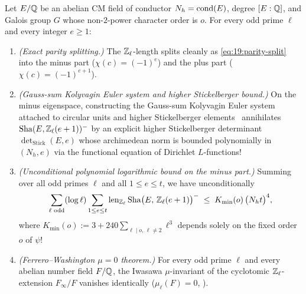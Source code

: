 \begin{theorem}
\label{thm:19:minus-part}
Let $E/\mathbb{Q}$ be an abelian CM field of conductor $N_h = \operatorname{cond}(E)$, degree $[E:\mathbb{Q}]$, and Galois group $G$ whose non-$2$-power character order is $o$. For every odd prime $\ell$ and every integer $e \ge 1$:
\begin{enumerate}[label=\textup{(\roman*)}]
\item \emph{(Exact parity splitting.)} The $\mathbb{Z}_\ell$-length splits cleanly as \eqref{eq:19:parity-split} into the minus part ($\chi(c) = (-1)^e$) and the plus part ($\chi(c) = (-1)^{e+1}$).
\item \emph{(Gauss-sum Kolyvagin Euler system and higher Stickelberger bound.)} On the minus eigenspace, constructing the Gauss-sum Kolyvagin Euler system attached to circular units and higher Stickelberger elements~\cite{Washington1997,Sinnott1984} annihilates $\mathrm{Sha}(E, \mathbb{Z}_\ell(e+1))^-$ by an explicit higher Stickelberger determinant $\det_{\mathrm{Stick}}(E, e)$ whose archimedean norm is bounded polynomially in $(N_h, e)$ via the functional equation of Dirichlet $L$-functions!
\item \emph{(Unconditional polynomial logarithmic bound on the minus part.)} Summing over all odd primes $\ell$ and all $1 \le e \le t$, we have unconditionally
  \begin{equation}
  \label{eq:19:minus-bound}
    \sum_{\ell \text{ odd}} (\log\ell) \sum_{1 \le e \le t} \operatorname{len}_{\mathbb{Z}_\ell}\mathrm{Sha}\bigl(E,\, \mathbb{Z}_\ell(e+1)\bigr)^{-}
    \;\le\; K_{\mathrm{min}}(o)\,\bigl(N_h t\bigr)^4,
  \end{equation}
  where $K_{\mathrm{min}}(o) := 3 + 240 \sum_{\ell \mid o,\, \ell \neq 2} \ell^3$ depends solely on the fixed order $o$ of $\psi$!
\item \emph{(Ferrero--Washington $\mu = 0$ theorem.)} For every odd prime $\ell$ and every abelian number field $F/\mathbb{Q}$, the Iwasawa $\mu$-invariant of the cyclotomic $\mathbb{Z}_\ell$-extension $F_\infty / F$ vanishes identically ($\mu_\ell(F) = 0$, ).
\end{enumerate}
\end{theorem}

